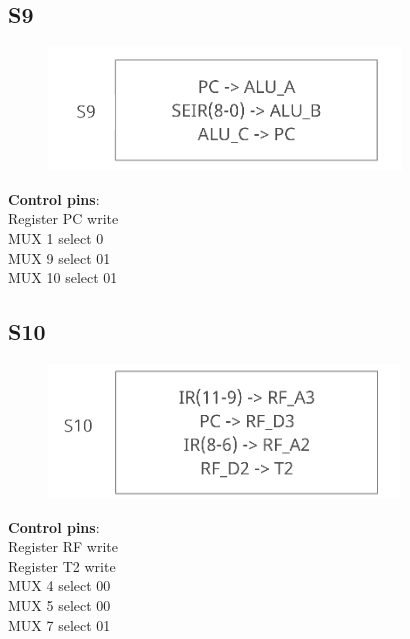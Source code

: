 \documentclass[11pt, fleqn]{article}
\begin{document}
\bigskip

\subsection*{\centering S9}
\begin{figure}[H]
    \centering
    \includegraphics{DataPath/DataPath_S9.PNG}
\end{figure}
\begin{center}
\textbf{Control pins}: \\
Register PC write \\
MUX 1 select 0 \\
MUX 9 select 01 \\
MUX 10 select 01 \\
\end{center}

\bigskip

\subsection*{\centering S10}
\begin{figure}[H]
    \centering
    \includegraphics{DataPath/DataPath_S10.PNG}
\end{figure}
\begin{center}
\textbf{Control pins}: \\
Register RF write \\
Register T2 write \\
MUX 4 select 00 \\
MUX 5 select 00 \\
MUX 7 select 01 \\
\end{center}

\bigskip
\end{document}
